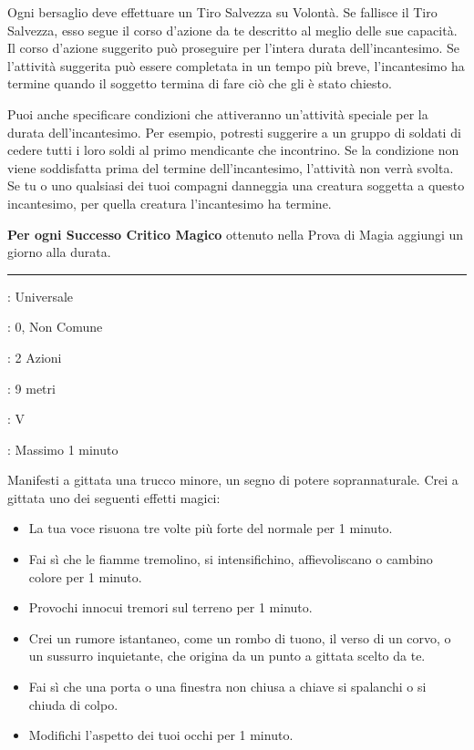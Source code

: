 \begin{multicols}{2}
Ogni bersaglio deve effettuare un Tiro Salvezza su Volontà. Se fallisce il Tiro Salvezza, esso segue il corso d'azione da te descritto al meglio delle sue capacità. Il corso d'azione suggerito può proseguire per l'intera durata dell'incantesimo. Se l'attività suggerita può essere completata in un tempo più breve, l'incantesimo ha termine quando il soggetto termina di fare ciò che gli è stato chiesto.

Puoi anche specificare condizioni che attiveranno un'attività speciale per la durata dell'incantesimo. Per esempio, potresti suggerire a un gruppo di soldati di cedere tutti i loro soldi al primo mendicante che incontrino. Se la condizione non viene soddisfatta prima del termine dell'incantesimo, l'attività non verrà svolta. Se tu o uno qualsiasi dei tuoi compagni danneggia una creatura soggetta a questo incantesimo, per quella creatura l'incantesimo ha termine.

\textbf{Per ogni Successo Critico Magico} ottenuto nella Prova di Magia aggiungi un giorno alla durata.

\smallskip\noindent\rule{\linewidth}{2pt} \hypertarget{Taumaturgia}{}\medskip{}
\noindent
\begin{description}[noitemsep, topsep=0pt, parsep=0pt, partopsep=0pt, leftmargin=0cm, labelwidth=2.8cm]
	\item[\textbf{Lista di Magia}]: Universale
	\item[\textbf{Livello}]: 0, Non Comune
	\item[\textbf{T. di Lancio}]: 2 Azioni
	\item[\textbf{Gittata}]: 9 metri
	\item[\textbf{Componenti}]: V
	\item[\textbf{Durata}]: Massimo 1 minuto
\end{description}

Manifesti a gittata una trucco minore, un segno di potere soprannaturale. Crei a gittata uno dei seguenti effetti magici:

\begin{itemize}[leftmargin=*] \setlength{\itemsep}{0pt}
	\item La tua voce risuona tre volte più forte del normale per 1 minuto.
	\item Fai sì che le fiamme tremolino, si intensifichino, affievoliscano o cambino colore per 1 minuto.
	\item Provochi innocui tremori sul terreno per 1 minuto.
	\item Crei un rumore istantaneo, come un rombo di tuono, il verso di un corvo, o un sussurro inquietante, che origina da un punto a gittata scelto da te.
	\item Fai sì che una porta o una finestra non chiusa a chiave si spalanchi o si chiuda di colpo.
	\item Modifichi l'aspetto dei tuoi occhi per 1 minuto.
\end{itemize}


\end{multicols}
